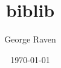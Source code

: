 \documentclass{article}
\title{biblib}
\author{George Raven}
\date{\today}
\begin{document}
\maketitle

\nocite{*}



\end{document}
